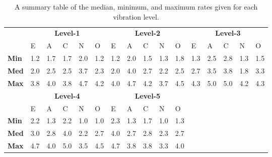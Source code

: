 \begin{table}[hbt!]
    \renewcommand{\arraystretch}{1}
    \begin{center}
        \begin{tabular}{p{}|
        p{}|p{}|p{}|p{}|p{}||
        p{}|p{}|p{}|p{}|p{}||
        p{}|p{}|p{}|p{}|p{}|}
            \cline{2-16}
            & \multicolumn{5}{c||}{\textbf{Level-1}} & \multicolumn{5}{c||}{\textbf{Level-2}}
            & \multicolumn{5}{c|}{\textbf{Level-3}} \\
            \cline{2-16}
            & E & A & C & N & O & E & A & C & N & O & E & A & C & N & O      \\
            \cline{2-16}
            \textbf{Min}    & 1.2 & 1.7 & 1.7 & 2.0 & 1.2 & 1.2 & 2.0 & 1.5 & 1.3 & 1.8 & 1.3 & 2.5 & 2.8 & 1.3 & 1.5  \\
            \textbf{Med}    & 2.0 & 2.5 & 2.5 & 3.7 & 2.3 & 2.0 & 4.0 & 2.7 & 2.2 & 2.5 & 2.7 & 3.5 & 3.8 & 1.8 & 3.3  \\
            \textbf{Max}    & 3.8 & 4.0 & 3.8 & 4.7 & 4.2 & 4.0 & 4.7 & 4.2 & 3.7 & 4.5 & 4.3 & 5.0 & 5.0 & 4.2 & 4.3 \\
            \cline{2-16}
            \cline{2-11}
            &  \multicolumn{5}{|c||}{\textbf{Level-4}} & \multicolumn{5}{|c||}{\textbf{Level-5}} \\
            \cline{2-11}
            & E & A & C & N & O & E & A & C & N & O            \\
            \cline{2-11}
            \textbf{Min}    & 2.2 & 1.3 & 2.2 & 1.0 & 1.0 & 2.3 & 1.3 & 1.7 & 1.0 & 1.3    \\
            \textbf{Med}    & 3.0 & 2.8 & 4.0 & 2.2 & 2.7 & 4.0 & 2.7 & 2.8 & 2.3 & 2.7    \\
            \textbf{Max}    & 4.7 & 4.0 & 5.0 & 3.5 & 4.5 & 4.7 & 3.8 & 3.8 & 3.3 & 4.0    \\
            \cline{2-11}
        \end{tabular}
        \caption{A summary table of the median, minimum, and maximum rates given for each vibration level.}
        \label{table:medianMM2}
    \end{center}
\end{table}

